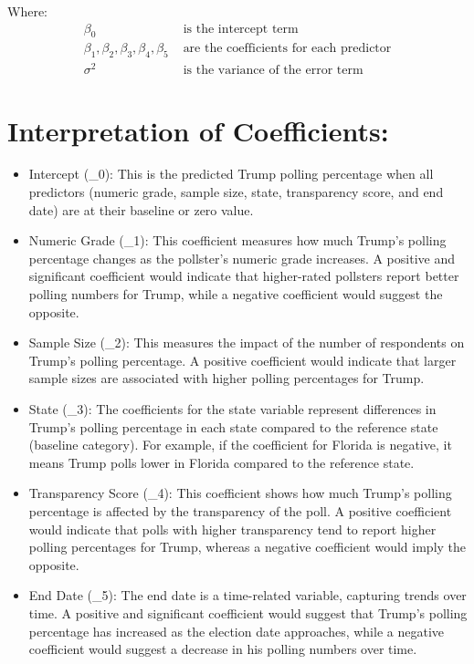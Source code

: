 \documentclass[
  letterpaper,
  DIV=11,
  numbers=noendperiod]{scrartcl}
\providecommand{\tightlist}{%
  \setlength{\itemsep}{0pt}\setlength{\parskip}{0pt}}\usepackage{longtable,booktabs,array}
\begin{document}
Where: \begin{align}
\beta_0 & \text{ is the intercept term} \\
\beta_1, \beta_2, \beta_3, \beta_4, \beta_5 & \text{ are the coefficients for each predictor} \\
\sigma^2 & \text{ is the variance of the error term}
\end{align}

\section{Interpretation of
Coefficients:}\label{interpretation-of-coefficients}

\begin{itemize}
\tightlist
\item
  Intercept (\beta\_0): This is the predicted Trump polling percentage
  when all predictors (numeric grade, sample size, state, transparency
  score, and end date) are at their baseline or zero value.
\item
  Numeric Grade (\beta\_1): This coefficient measures how much Trump's
  polling percentage changes as the pollster's numeric grade increases.
  A positive and significant coefficient would indicate that
  higher-rated pollsters report better polling numbers for Trump, while
  a negative coefficient would suggest the opposite.
\item
  Sample Size (\beta\_2): This measures the impact of the number of
  respondents on Trump's polling percentage. A positive coefficient
  would indicate that larger sample sizes are associated with higher
  polling percentages for Trump.
\item
  State (\beta\_3): The coefficients for the state variable represent
  differences in Trump's polling percentage in each state compared to
  the reference state (baseline category). For example, if the
  coefficient for Florida is negative, it means Trump polls lower in
  Florida compared to the reference state.
\item
  Transparency Score (\beta\_4): This coefficient shows how much Trump's
  polling percentage is affected by the transparency of the poll. A
  positive coefficient would indicate that polls with higher
  transparency tend to report higher polling percentages for Trump,
  whereas a negative coefficient would imply the opposite.
\item
  End Date (\beta\_5): The end date is a time-related variable,
  capturing trends over time. A positive and significant coefficient
  would suggest that Trump's polling percentage has increased as the
  election date approaches, while a negative coefficient would suggest a
  decrease in his polling numbers over time.
\end{itemize}
\end{document}
